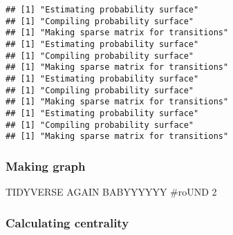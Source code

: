\documentclass[
]{article}
\newenvironment{Shaded}{\begin{snugshade}}{\end{snugshade}}
\newcommand{\AttributeTok}[1]{\textcolor[rgb]{0.77,0.63,0.00}{#1}}
\newcommand{\ControlFlowTok}[1]{\textcolor[rgb]{0.13,0.29,0.53}{\textbf{#1}}}
\newcommand{\DecValTok}[1]{\textcolor[rgb]{0.00,0.00,0.81}{#1}}
\newcommand{\FunctionTok}[1]{\textcolor[rgb]{0.00,0.00,0.00}{#1}}
\newcommand{\NormalTok}[1]{#1}
\newcommand{\OtherTok}[1]{\textcolor[rgb]{0.56,0.35,0.01}{#1}}
\newcommand{\SpecialCharTok}[1]{\textcolor[rgb]{0.00,0.00,0.00}{#1}}
\newcommand{\StringTok}[1]{\textcolor[rgb]{0.31,0.60,0.02}{#1}}
\begin{document}
\begin{verbatim}
## [1] "Estimating probability surface"
## [1] "Compiling probability surface"
## [1] "Making sparse matrix for transitions"
## [1] "Estimating probability surface"
## [1] "Compiling probability surface"
## [1] "Making sparse matrix for transitions"
## [1] "Estimating probability surface"
## [1] "Compiling probability surface"
## [1] "Making sparse matrix for transitions"
## [1] "Estimating probability surface"
## [1] "Compiling probability surface"
## [1] "Making sparse matrix for transitions"
\end{verbatim}

\hypertarget{making-graph-2}{%
\subsubsection{Making graph}\label{making-graph-2}}

TIDYVERSE AGAIN BABYYYYYY \#roUND 2

\begin{Shaded}
\end{Shaded}

\hypertarget{calculating-centrality-2}{%
\subsubsection{Calculating centrality}\label{calculating-centrality-2}}
\end{document}
